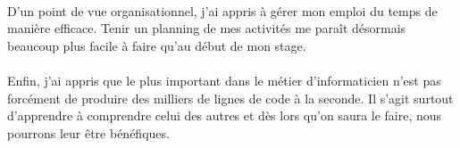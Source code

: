 \documentclass[12pt]{report}
\begin{document}
\paragraph{}
D'un point de vue organisationnel, j'ai appris à gérer mon emploi du temps de manière efficace. Tenir un planning de mes activités me paraît désormais beaucoup plus facile à faire qu'au début de mon stage. 

\paragraph{}
Enfin, j'ai appris que le plus important dans le métier d'informaticien n'est pas forcément de produire des milliers de lignes de code à la seconde. 
Il s'agit surtout d'apprendre à comprendre celui des autres et dès lors qu'on saura le faire, nous pourrons leur être bénéfiques.

\nocite{*} %
\printbibliography
\end{document}
